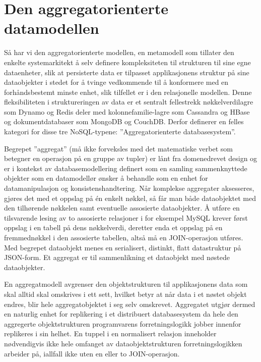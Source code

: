 \section{Den aggregatorienterte datamodellen}

Så har vi den aggregatorienterte modellen, en metamodell som tillater den enkelte systemarkitekt å selv definere kompleksiteten til strukturen til sine egne dataenheter, slik at persisterte data er tilpasset applikasjonens struktur på sine dataobjekter i stedet for å tvinge vedkommende til å konformere med en forhåndsbestemt minste enhet, slik tilfellet er i den relasjonelle modellen. Denne fleksibiliteten i struktureringen av data er et sentralt fellestrekk nøkkelverdilagre som Dynamo og Redis deler med kolonnefamilie-lagre som Cassandra og HBase og dokumentdatabaser som MongoDB og CouchDB. Derfor definerer \cite{sadalage2013} en felles kategori for disse tre NoSQL-typene: ''Aggregatorienterte databasesystem''.

Begrepet ''aggregat'' (må ikke forveksles med det matematiske verbet som betegner en operasjon på en gruppe av tupler) er lånt fra domenedrevet design og er i kontekst av databasemodellering definert som en samling sammenknyttede objekter som en datamodellør ønsker å behandle som en enhet for datamanipulasjon og konsistenshandtering. Når komplekse aggregater aksesseres, gjøres det med et oppslag på én enkelt nøkkel, så får man både dataobjektet med den tilhørende nøkkelen samt eventuelle assosierte dataobjekter. Å utføre en tilsvarende lesing av to assosierte relasjoner i for eksempel MySQL krever først oppslag i en tabell på dens nøkkelverdi, deretter enda et oppslag på en fremmednøkkel i den assosierte tabellen, altså må en JOIN-operasjon utføres. Med begrepet dataobjekt menes en serialisert, distinkt, flatt datastruktur på JSON-form. Et aggregat er til sammenlikning et dataobjekt med nøstede dataobjekter.

En aggregatmodell avgrenser den objektstrukturen til applikasjonens data som skal alltid skal omskrives i ett sett, hvilket betyr at når data i et nøstet objekt endres, blir hele aggregatobjektet i seg selv omskrevet. Aggregatet utgjør dermed en naturlig enhet for replikering i et distribuert databasesystem da hele den aggregerte objektstrukturen programvarens forretningslogikk jobber innenfor replikeres i sin helhet. En tuppel i en normalisert relasjon inneholder nødvendigvis ikke hele omfanget av dataobjektstrukturen forretningslogikken arbeider på, iallfall ikke uten en eller to JOIN-operasjon.

